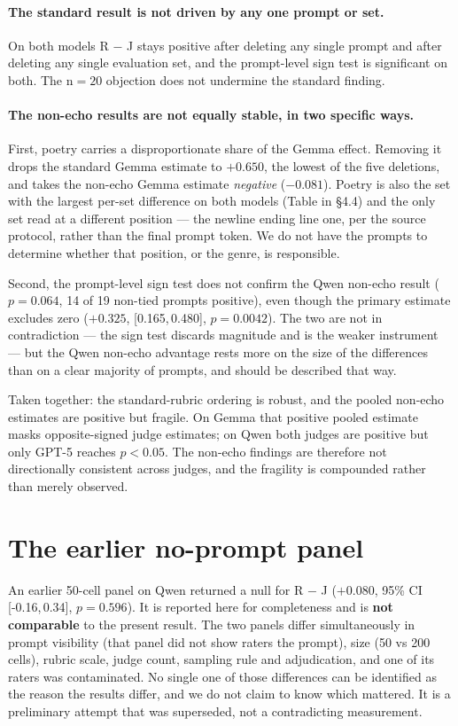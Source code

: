 \documentclass[11pt]{article}
\newcommand{\ci}[2]{[#1,\,#2]}
\newcommand{\flag}[1]{\textcolor{flagged}{#1}}
\begin{document}
\paragraph{The standard result is not driven by any one prompt or set.} On both
models R $-$ J stays positive after deleting any single prompt and after
deleting any single evaluation set, and the prompt-level sign test is
significant on both. The n${=}20$ objection does not undermine the standard
finding.

\paragraph{The non-echo results are not equally stable, in two specific ways.}

First, \flag{poetry carries a disproportionate share of the Gemma effect}.
Removing it drops the standard Gemma estimate to $+0.650$, the lowest of the
five deletions, and takes the non-echo Gemma estimate \emph{negative}
($-0.081$). Poetry is also the set with the largest per-set difference on both
models (Table in \S4.4) and the only set read at a different position --- the
newline ending line one, per the source protocol, rather than the final prompt
token. We do not have the prompts to determine whether that position, or the
genre, is responsible.

Second, \flag{the prompt-level sign test does not confirm the Qwen non-echo
result} ($p=0.064$, 14 of 19 non-tied prompts positive), even though the primary
estimate excludes zero ($+0.325$, \ci{0.165}{0.480}, $p=0.0042$). The two are
not in contradiction --- the sign test discards magnitude and is the weaker
instrument --- but the Qwen non-echo advantage rests more on the size of the
differences than on a clear majority of prompts, and should be described that
way.

Taken together: the standard-rubric ordering is robust, and the pooled non-echo
estimates are positive but fragile. On Gemma that positive pooled estimate masks
opposite-signed judge estimates; on Qwen both judges are positive but only GPT-5
reaches $p<0.05$. The non-echo findings are therefore not directionally
consistent across judges, and the fragility is compounded rather than merely
observed.

\section{The earlier no-prompt panel}

An earlier 50-cell panel on Qwen returned a null for R $-$ J ($+0.080$, 95\% CI
\ci{-0.16}{0.34}, $p = 0.596$). It is reported here for completeness and is
\textbf{not comparable} to the present result. The two panels differ
simultaneously in prompt visibility (that panel did not show raters the prompt),
size (50 vs 200 cells), rubric scale, judge count, sampling rule and
adjudication, and one of its raters was contaminated. No single one of those
differences can be identified as the reason the results differ, and we do not
claim to know which mattered. It is a preliminary attempt that was superseded,
not a contradicting measurement.
\end{document}
